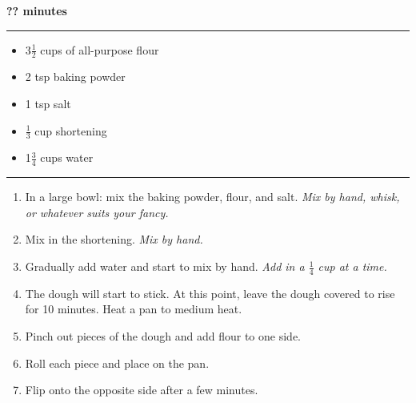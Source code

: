  \hfill {\large \textbf{?? minutes}}

\vspace{15pt} \hrule \vspace{15pt}
\begin{itemize}
	\item 3$\frac{1}{2}$ cups of all-purpose flour
	\item 2 tsp baking powder
	\item 1 tsp salt
	\item $\frac{1}{3}$ cup shortening
	\item 1$\frac{3}{4}$ cups water
\end{itemize}

\vspace{15pt} \hrule \vspace{15pt}
\begin{enumerate}
	\item In a large bowl: mix the baking powder, flour, and salt. \textit{Mix by hand, whisk, or whatever suits your fancy.}
	\item Mix in the shortening. \textit{Mix by hand.}
	\item Gradually add water and start to mix by hand. \textit{Add in a $\frac{1}{4}$ cup at a time.}
	\item The dough will start to stick. At this point, leave the dough covered to rise for 10 minutes. Heat a pan to medium heat.
	\item Pinch out pieces of the dough and add flour to one side.
	\item Roll each piece and place on the pan.
	\item Flip onto the opposite side after a few minutes.
\end{enumerate}
